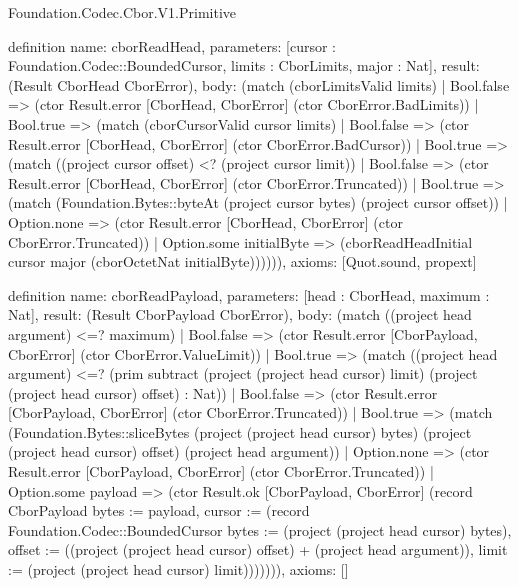 \begin{lexlean}{Foundation.Codec.Cbor.V1.Primitive}
\begin{semanticmodule}
definition{
  name: cborReadHead,
  parameters: [cursor : Foundation.Codec::BoundedCursor, limits : CborLimits, major : Nat],
  result: (Result CborHead CborError),
  body: (match (cborLimitsValid limits)
    | Bool.false => (ctor Result.error [CborHead, CborError] (ctor CborError.BadLimits))
    | Bool.true => (match (cborCursorValid cursor limits)
      | Bool.false => (ctor Result.error [CborHead, CborError] (ctor CborError.BadCursor))
      | Bool.true => (match ((project cursor offset) <? (project cursor limit))
        | Bool.false => (ctor Result.error [CborHead, CborError] (ctor CborError.Truncated))
        | Bool.true => (match (Foundation.Bytes::byteAt (project cursor bytes) (project cursor offset))
          | Option.none => (ctor Result.error [CborHead, CborError] (ctor CborError.Truncated))
          | Option.some initialByte => (cborReadHeadInitial cursor major (cborOctetNat initialByte)))))),
  axioms: [Quot.sound, propext]
}

definition{
  name: cborReadPayload,
  parameters: [head : CborHead, maximum : Nat],
  result: (Result CborPayload CborError),
  body: (match ((project head argument) <=? maximum)
    | Bool.false => (ctor Result.error [CborPayload, CborError] (ctor CborError.ValueLimit))
    | Bool.true => (match ((project head argument) <=? (prim subtract (project (project head cursor) limit) (project (project head cursor) offset) : Nat))
      | Bool.false => (ctor Result.error [CborPayload, CborError] (ctor CborError.Truncated))
      | Bool.true => (match (Foundation.Bytes::sliceBytes (project (project head cursor) bytes) (project (project head cursor) offset) (project head argument))
        | Option.none => (ctor Result.error [CborPayload, CborError] (ctor CborError.Truncated))
        | Option.some payload => (ctor Result.ok [CborPayload, CborError] (record CborPayload {bytes := payload, cursor := (record Foundation.Codec::BoundedCursor {bytes := (project (project head cursor) bytes), offset := ((project (project head cursor) offset) + (project head argument)), limit := (project (project head cursor) limit)})}))))),
  axioms: []
}


\end{semanticmodule}
\end{lexlean}
